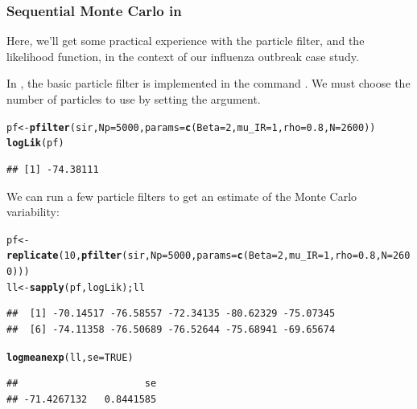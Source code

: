 \documentclass{beamer}\usepackage[]{graphicx}\usepackage[]{color}
\makeatletter
\newcommand{\hlnum}[1]{\textcolor[rgb]{0.686,0.059,0.569}{#1}}%
\newcommand{\hlstd}[1]{\textcolor[rgb]{0.345,0.345,0.345}{#1}}%
\newcommand{\hlkwb}[1]{\textcolor[rgb]{0.69,0.353,0.396}{#1}}%
\newcommand{\hlkwc}[1]{\textcolor[rgb]{0.333,0.667,0.333}{#1}}%
\newcommand{\hlkwd}[1]{\textcolor[rgb]{0.737,0.353,0.396}{\textbf{#1}}}%
\newenvironment{kframe}{%
 \def\at@end@of@kframe{}%
 \ifinner\ifhmode%
  \def\at@end@of@kframe{\end{minipage}}%
  \begin{minipage}{\columnwidth}%
 \fi\fi%
 \def\FrameCommand##1{\hskip\@totalleftmargin \hskip-\fboxsep
 \colorbox{shadecolor}{##1}\hskip-\fboxsep
     \hskip-\linewidth \hskip-\@totalleftmargin \hskip\columnwidth}%
 \MakeFramed {\advance\hsize-\width
   \@totalleftmargin\z@ \linewidth\hsize
   \@setminipage}}%
 {\par\unskip\endMakeFramed%
 \at@end@of@kframe}
\newenvironment{knitrout}{}{} %
\makeatother
\begin{document}
\begin{frame}[fragile]


\frametitle{Sequential Monte Carlo in }

\bi

\item  Here, we'll get some practical experience with the particle filter, and the likelihood function, in the context of our influenza outbreak case study.

\item  In , the basic particle filter is implemented in the command .
We must choose the number of particles to use by setting the  argument.
\ei

\begin{knitrout}\small
{}\color{fgcolor}\begin{kframe}
\begin{alltt}
\hlstd{pf} \hlkwb{<-} \hlkwd{pfilter}\hlstd{(sir,}\hlkwc{Np}\hlstd{=}\hlnum{5000}\hlstd{,}\hlkwc{params}\hlstd{=}\hlkwd{c}\hlstd{(}\hlkwc{Beta}\hlstd{=}\hlnum{2}\hlstd{,}\hlkwc{mu_IR}\hlstd{=}\hlnum{1}\hlstd{,}\hlkwc{rho}\hlstd{=}\hlnum{0.8}\hlstd{,}\hlkwc{N}\hlstd{=}\hlnum{2600}\hlstd{))}
\hlkwd{logLik}\hlstd{(pf)}
\end{alltt}
\begin{verbatim}
## [1] -74.38111
\end{verbatim}
\end{kframe}
\end{knitrout}

\bi
\item  We can run a few particle filters to get an estimate of the Monte Carlo variability:
\ei

\begin{knitrout}\small
{}\color{fgcolor}\begin{kframe}
\begin{alltt}
\hlstd{pf} \hlkwb{<-} \hlkwd{replicate}\hlstd{(}\hlnum{10}\hlstd{,}\hlkwd{pfilter}\hlstd{(sir,}\hlkwc{Np}\hlstd{=}\hlnum{5000}\hlstd{,}\hlkwc{params}\hlstd{=}\hlkwd{c}\hlstd{(}\hlkwc{Beta}\hlstd{=}\hlnum{2}\hlstd{,}\hlkwc{mu_IR}\hlstd{=}\hlnum{1}\hlstd{,}\hlkwc{rho}\hlstd{=}\hlnum{0.8}\hlstd{,}\hlkwc{N}\hlstd{=}\hlnum{2600}\hlstd{)))}
\hlstd{ll} \hlkwb{<-} \hlkwd{sapply}\hlstd{(pf,logLik); ll}
\end{alltt}
\begin{verbatim}
##  [1] -70.14517 -76.58557 -72.34135 -80.62329 -75.07345
##  [6] -74.11358 -76.50689 -76.52644 -75.68941 -69.65674
\end{verbatim}
\begin{alltt}
\hlkwd{logmeanexp}\hlstd{(ll,}\hlkwc{se}\hlstd{=}\hlnum{TRUE}\hlstd{)}
\end{alltt}
\begin{verbatim}
##                      se 
## -71.4267132   0.8441585
\end{verbatim}
\end{kframe}
\end{knitrout}

\end{frame}
\end{document}
